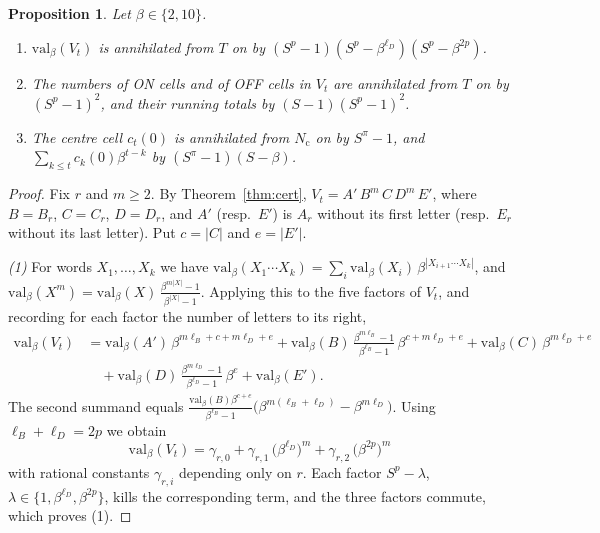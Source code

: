 \documentclass[11pt]{article}
\newtheorem{proposition}[theorem]{Proposition}
\theoremstyle{definition}
\theoremstyle{remark}
\begin{document}
\begin{proposition}\label{prop:ann}
Let $\beta\in\{2,10\}$.
\begin{enumerate}
\item $\mathrm{val}_\beta(V_t)$ is annihilated from $T$ on by $(S^p-1)(S^p-\beta^{\ell_D})(S^p-\beta^{2p})$.
\item The numbers of ON cells and of OFF cells in $V_t$ are annihilated from $T$ on by $(S^p-1)^2$, and their running totals by $(S-1)(S^p-1)^2$.
\item The centre cell $c_t(0)$ is annihilated from $N_{\mathrm c}$ on by $S^\pi-1$, and $\sum_{k\le t}c_k(0)\beta^{t-k}$ by $(S^\pi-1)(S-\beta)$.
\end{enumerate}
\end{proposition}

\begin{proof}
Fix $r$ and $m\ge 2$. By Theorem~\ref{thm:cert}, $V_t=A'\,B^m\,C\,D^m\,E'$, where $B=B_r$, $C=C_r$, $D=D_r$, and $A'$ (resp.\ $E'$) is $A_r$ without its first letter (resp.\ $E_r$ without its last letter). Put $c=|C|$ and $e=|E'|$.

\emph{(1)} For words $X_1,\dots,X_k$ we have $\mathrm{val}_\beta(X_1\cdots X_k)=\sum_{i}\mathrm{val}_\beta(X_i)\,\beta^{|X_{i+1}\cdots X_k|}$, and $\mathrm{val}_\beta(X^m)=\mathrm{val}_\beta(X)\,\frac{\beta^{m|X|}-1}{\beta^{|X|}-1}$. Applying this to the five factors of $V_t$, and recording for each factor the number of letters to its right,
\begin{align*}
\mathrm{val}_\beta(V_t)
&=\mathrm{val}_\beta(A')\,\beta^{m\ell_B+c+m\ell_D+e}
+\mathrm{val}_\beta(B)\,\frac{\beta^{m\ell_B}-1}{\beta^{\ell_B}-1}\,\beta^{c+m\ell_D+e}
+\mathrm{val}_\beta(C)\,\beta^{m\ell_D+e}\\
&\quad+\mathrm{val}_\beta(D)\,\frac{\beta^{m\ell_D}-1}{\beta^{\ell_D}-1}\,\beta^{e}
+\mathrm{val}_\beta(E').
\end{align*}
The second summand equals $\frac{\mathrm{val}_\beta(B)\beta^{c+e}}{\beta^{\ell_B}-1}\bigl(\beta^{m(\ell_B+\ell_D)}-\beta^{m\ell_D}\bigr)$. Using $\ell_B+\ell_D=2p$ we obtain
\[
\mathrm{val}_\beta(V_t)=\gamma_{r,0}+\gamma_{r,1}\,\bigl(\beta^{\ell_D}\bigr)^m+\gamma_{r,2}\,\bigl(\beta^{2p}\bigr)^m
\]
with rational constants $\gamma_{r,i}$ depending only on $r$. Each factor $S^p-\lambda$, $\lambda\in\{1,\beta^{\ell_D},\beta^{2p}\}$, kills the corresponding term, and the three factors commute, which proves (1).


\end{proof}
\end{document}
